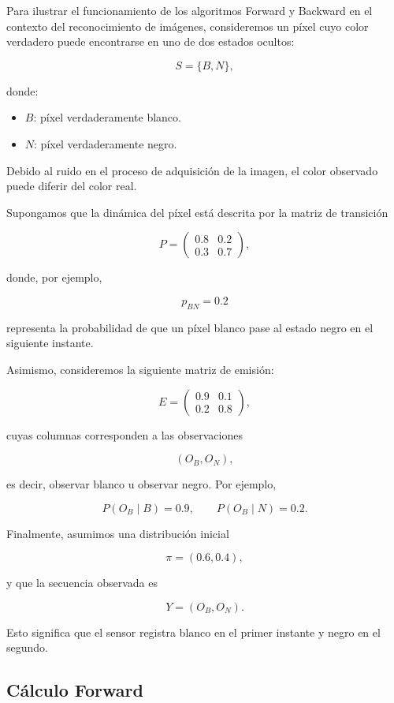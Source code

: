 \documentclass[
  spanish,
  us-letterpaper,
  DIV=11,
  numbers=noendperiod]{scrreprt}
\providecommand{\tightlist}{%
  \setlength{\itemsep}{0pt}\setlength{\parskip}{0pt}}
\begin{document}
Para ilustrar el funcionamiento de los algoritmos Forward y Backward en
el contexto del reconocimiento de imágenes, consideremos un píxel cuyo
color verdadero puede encontrarse en uno de dos estados ocultos:

\[
S=\{B,N\},
\]

donde:

\begin{itemize}
\tightlist
\item
  \(B\): píxel verdaderamente blanco.
\item
  \(N\): píxel verdaderamente negro.
\end{itemize}

Debido al ruido en el proceso de adquisición de la imagen, el color
observado puede diferir del color real.

Supongamos que la dinámica del píxel está descrita por la matriz de
transición

\[
P=
\begin{pmatrix}
0.8 & 0.2\\
0.3 & 0.7
\end{pmatrix},
\]

donde, por ejemplo,

\[
p_{BN}=0.2
\]

representa la probabilidad de que un píxel blanco pase al estado negro
en el siguiente instante.

Asimismo, consideremos la siguiente matriz de emisión:

\[
E=
\begin{pmatrix}
0.9 & 0.1\\
0.2 & 0.8
\end{pmatrix},
\]

cuyas columnas corresponden a las observaciones

\[
(O_B,O_N),
\]

es decir, observar blanco u observar negro. Por ejemplo,

\[
P(O_B \mid B)=0.9,
\qquad
P(O_B \mid N)=0.2.
\]

Finalmente, asumimos una distribución inicial

\[
\pi=(0.6,0.4),
\]

y que la secuencia observada es

\[
Y=(O_B,O_N).
\]

Esto significa que el sensor registra blanco en el primer instante y
negro en el segundo.

\subsection{Cálculo Forward}\label{cuxe1lculo-forward}
\end{document}
